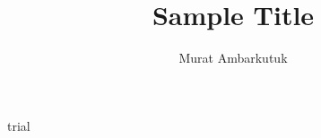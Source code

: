 \documentclass[man]{apa}
\title{Sample Title}
\author{Murat Ambarkutuk}
\affiliation{English Language Institute, University of Delaware}
\begin{document}
trial
\end{document}
